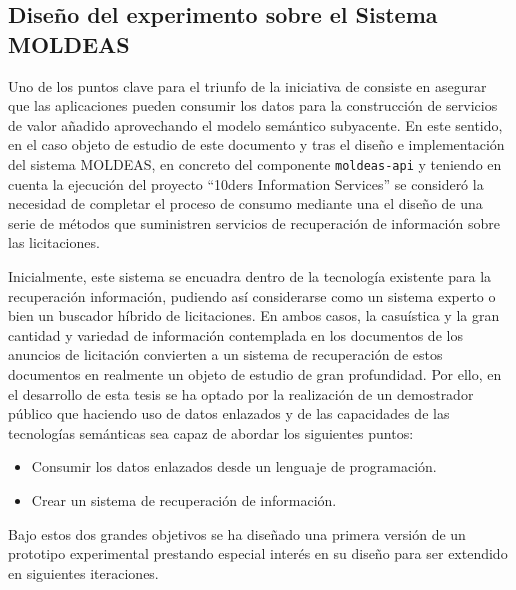 \subsection{Diseño del experimento sobre el Sistema MOLDEAS}
Uno de los puntos clave para el triunfo de la iniciativa de \linkeddata consiste 
en asegurar que las aplicaciones pueden consumir los datos para la construcción de servicios 
de valor añadido aprovechando el modelo semántico subyacente. En este sentido, 
en el caso objeto de estudio de este documento y tras el diseño e implementación 
del sistema \gls{MOLDEAS}, en concreto del componente \texttt{moldeas-api} y teniendo 
en cuenta la ejecución del proyecto ``10ders Information Services'' se consideró 
la necesidad de completar el proceso de consumo mediante una el diseño de 
una serie de métodos que suministren servicios de recuperación de información 
sobre las licitaciones.

Inicialmente, este sistema se encuadra dentro de la tecnología existente 
para la recuperación información, pudiendo así considerarse como un sistema 
experto o bien un buscador híbrido de licitaciones. En ambos casos, la casuística 
y la gran cantidad y variedad de información contemplada en los documentos de los anuncios 
de licitación convierten a un sistema de recuperación de estos documentos en realmente 
un objeto de estudio de gran profundidad. Por ello, en el desarrollo de esta tesis 
se ha optado por la realización de un demostrador público que haciendo uso 
de datos enlazados y de las capacidades de las tecnologías semánticas sea capaz de 
abordar los siguientes puntos:
\begin{itemize}
 \item Consumir los datos enlazados desde un lenguaje de programación.
 \item Crear un sistema de recuperación de información.
\end{itemize}

Bajo estos dos grandes objetivos se ha diseñado una primera versión de un 
prototipo experimental prestando especial interés en su diseño para ser extendido 
en siguientes iteraciones.

